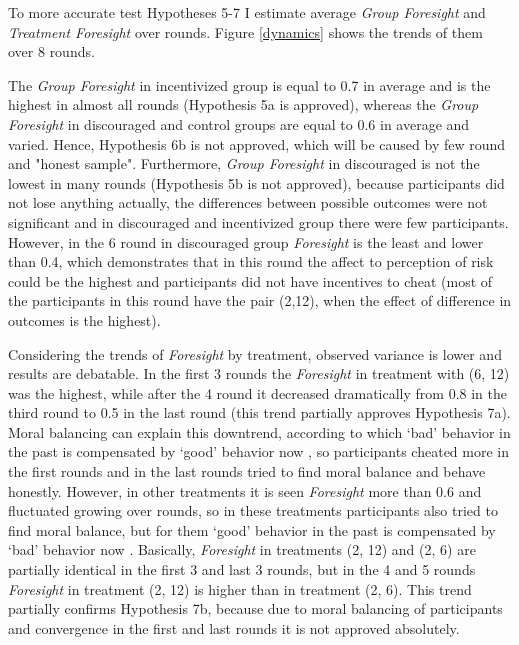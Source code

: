\documentclass[12pt]{article}
\begin{document}
 	 To more accurate test Hypotheses 5-7 I estimate average \textit{Group Foresight} and \textit{Treatment Foresight} over rounds. Figure \ref{dynamics} shows the trends of them over 8 rounds.
 	
 	The \textit{Group Foresight} in incentivized group is equal to 0.7 in average and is the highest in almost all rounds (Hypothesis 5a is approved), whereas the \textit{Group Foresight} in discouraged and control groups are equal to 0.6 in average and varied. Hence, Hypothesis 6b is not approved, which will be caused by few round and "honest sample". Furthermore, \textit{Group Foresight} in discouraged is not the lowest in many rounds (Hypothesis 5b is not approved), because participants did not lose anything actually, the differences between possible outcomes were not significant and in discouraged and incentivized group there were few participants. However, in the 6 round in discouraged group \textit{Foresight} is the least and lower than 0.4, which demonstrates that in this round the affect to perception of risk could be the highest and participants did not have incentives to cheat (most of the participants in this round have the pair (2,12), when the effect of difference in outcomes is the highest). 
 	
 	
 	Considering the trends of \textit{Foresight} by treatment, observed variance is lower and results are debatable. In the first 3 rounds the \textit{Foresight} in treatment with (6, 12) was the highest, while after the 4 round it decreased dramatically from 0.8 in the third round to 0.5 in the last round (this trend partially approves Hypothesis 7a). Moral balancing can explain this downtrend, according to which ‘bad’ behavior in the past is compensated by ‘good’ behavior now \autocite{mazar2010green}, so participants cheated more in the first rounds and in the last rounds tried to find moral balance and behave honestly. However, in other treatments it is seen \textit{Foresight} more than 0.6 and fluctuated growing over rounds, so in these treatments participants also tried to find moral balance, but for them ‘good’ behavior in the past is compensated by ‘bad’ behavior now \autocite{clot2014smug}. Basically, \textit{Foresight} in treatments (2, 12) and (2, 6) are partially identical in the first 3 and last 3 rounds, but in the 4 and 5 rounds \textit{Foresight} in treatment (2, 12) is higher than in treatment (2, 6). This trend partially confirms Hypothesis 7b, because due to moral balancing of participants and convergence in the first and last rounds it is not approved absolutely.
 	
\end{document}
